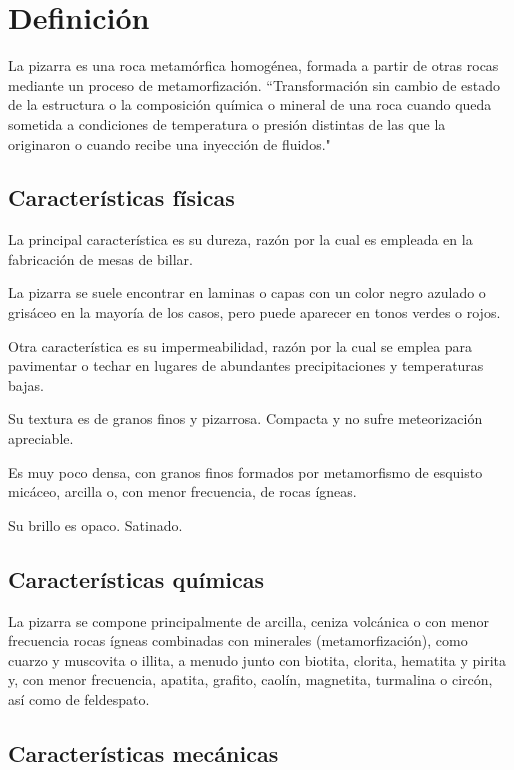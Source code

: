 \section {Definición}

	La pizarra es una roca metamórfica homogénea, formada a partir de otras rocas mediante un proceso de metamorfización. ``Transformación sin cambio de estado de la estructura o la composición química o mineral de una roca cuando queda sometida a condiciones de temperatura o presión distintas de las que la originaron o cuando recibe una inyección de fluidos."

	\subsection {Características físicas}
	La principal característica es su dureza, razón por la cual es empleada en la fabricación de mesas de billar.

	La pizarra se suele encontrar en laminas o capas con un color negro azulado o grisáceo en la mayoría de los casos, pero puede aparecer en tonos verdes o rojos.

	Otra característica es su impermeabilidad, razón por la cual se emplea para pavimentar o techar en lugares de abundantes precipitaciones y temperaturas bajas. 

Su textura es de granos finos y pizarrosa. Compacta y no sufre meteorización apreciable.

Es muy poco densa, con granos finos formados por metamorfismo de esquisto micáceo, arcilla o, con menor frecuencia, de rocas ígneas.

Su brillo es opaco. Satinado.

	\subsection {Características químicas}

La pizarra se compone principalmente de arcilla, ceniza volcánica o con menor frecuencia rocas ígneas combinadas con minerales (metamorfización), como cuarzo y muscovita o illita, a menudo junto con biotita, clorita, hematita y pirita y, con menor frecuencia, apatita, grafito, caolín, magnetita, turmalina o circón, así como de feldespato.

	\subsection {Características mecánicas}
 
